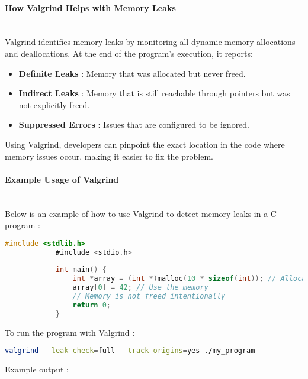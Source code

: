 \documentclass[12pt]{article}
\begin{document}
            \paragraph{How Valgrind Helps with Memory Leaks}\\
            Valgrind identifies memory leaks by monitoring all dynamic memory allocations and deallocations. At the end of the program's execution, it reports:
            \begin{itemize}
                \item \textbf{Definite Leaks} : Memory that was allocated but never freed.
                \item \textbf{Indirect Leaks} : Memory that is still reachable through pointers but was not explicitly freed.
                \item \textbf{Suppressed Errors} : Issues that are configured to be ignored.
            \end{itemize}
            
            Using Valgrind, developers can pinpoint the exact location in the code where memory issues occur, making it easier to fix the problem.
            
            \paragraph{Example Usage of Valgrind}\\
            Below is an example of how to use Valgrind to detect memory leaks in a C program :
            
            \begin{lstlisting}[language=C]
            #include <stdlib.h>
            #include <stdio.h>
            
            int main() {
                int *array = (int *)malloc(10 * sizeof(int)); // Allocate memory
                array[0] = 42; // Use the memory
                // Memory is not freed intentionally
                return 0;
            }
            \end{lstlisting}
            \vspace*{2cm}
            To run the program with Valgrind :
            
            \begin{lstlisting}[language=bash]
            valgrind --leak-check=full --track-origins=yes ./my_program
            \end{lstlisting}
            \vspace*{2cm}
            Example output :
            
\end{document}
